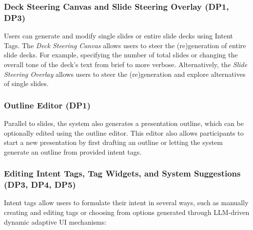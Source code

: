 \subsubsection{\textbf{Deck Steering Canvas and Slide Steering Overlay (DP1, DP3)} }
 Users can generate and modify single slides or entire slide decks using Intent Tags.
The \textit{Deck Steering Canvas} allows users to steer the (re)generation of entire slide decks. For example, specifying the number of total slides or changing the overall tone of the deck's text from brief to more verbose. 
Alternatively, the \textit{Slide Steering Overlay} allows users to steer the (re)generation and explore alternatives of single slides. 


\subsubsection{\textbf{Outline Editor (DP1)}}

Parallel to slides, the system also generates a presentation outline, which can be optionally edited using the outline editor. This editor also allows participants to start a new presentation by first drafting an outline or letting the system generate an outline from provided intent tags.  

\subsubsection{\textbf{Editing Intent Tags, Tag Widgets, and System Suggestions (DP3, DP4, DP5)}}

Intent tags allow users to formulate their intent in several ways, such as manually creating and editing tags or choosing from options generated through LLM-driven dynamic adaptive UI mechanisms:


